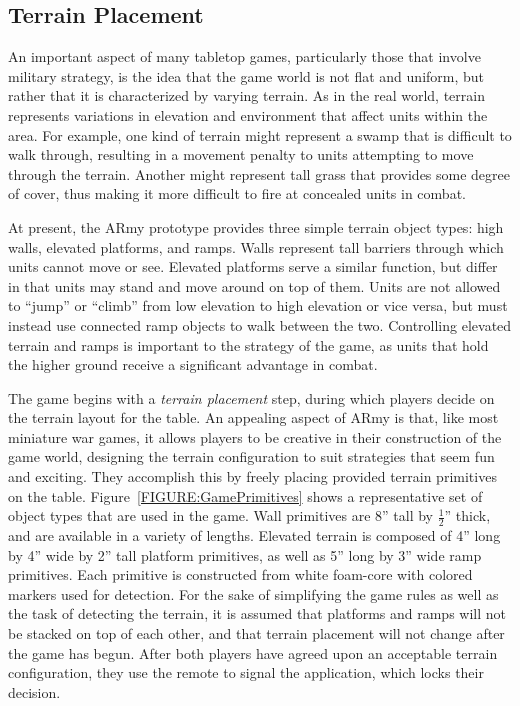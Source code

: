 \documentclass{thesis}
\begin{document}
\subsection{Terrain Placement}

An important aspect of many tabletop games, particularly those that involve military strategy, is the idea that the game world is not flat and uniform, but rather that it is characterized by varying terrain. As in the real world, terrain represents variations in elevation and environment that affect units within the area. For example, one kind of terrain might represent a swamp that is difficult to walk through, resulting in a movement penalty to units attempting to move through the terrain. Another might represent tall grass that provides some degree of cover, thus making it more difficult to fire at concealed units in combat. 

At present, the ARmy prototype provides three simple terrain object types: high walls, elevated platforms, and ramps. Walls represent tall barriers through which units cannot move or see. Elevated platforms serve a similar function, but differ in that units may stand and move around on top of them. Units are not allowed to ``jump'' or ``climb'' from low elevation to high elevation or vice versa, but must instead use connected ramp objects to walk between the two. Controlling elevated terrain and ramps is important to the strategy of the game, as units that hold the higher ground receive a significant advantage in combat.

The game begins with a \emph{terrain placement} step, during which players decide on the terrain layout for the table. An appealing aspect of ARmy is that, like most miniature war games, it allows players to be creative in their construction of the game world, designing the terrain configuration to suit strategies that seem fun and exciting. They accomplish this by freely placing provided terrain primitives on the table. Figure~\ref{FIGURE:GamePrimitives} shows a representative set of object types that are used in the game. Wall primitives are 8'' tall by \begin{math}\frac{1}{2}\end{math}'' thick, and are available in a variety of lengths. Elevated terrain is composed of 4'' long by 4'' wide by 2'' tall platform primitives, as well as 5'' long by 3'' wide ramp primitives. Each primitive is constructed from white foam-core with colored markers used for detection. For the sake of simplifying the game rules as well as the task of detecting the terrain, it is assumed that platforms and ramps will not be stacked on top of each other, and that terrain placement will not change after the game has begun. After both players have agreed upon an acceptable terrain configuration, they use the remote to signal the application, which locks their decision.
\end{document}
